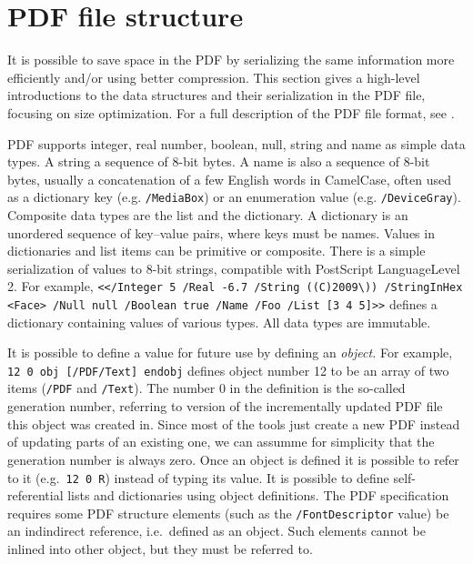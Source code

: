\documentclass{ltugproc}
\begin{document}
\section{PDF file structure}

It is possible to save space in the PDF by serializing the same information
more efficiently and/or using better compression. This section gives a
high-level introductions to the data structures and their serialization in
the PDF file, focusing on size optimization. For a full description of the
PDF file format, see \cite{pdfref}.

PDF supports integer, real number, boolean, null, string and name as
simple data types. A string a sequence of 8-bit bytes. A name is also a
sequence of 8-bit bytes, usually a concatenation of a few English words in
CamelCase, often used as a dictionary key (e.g. \texttt{/MediaBox}) or an
enumeration value (e.g. \texttt{/DeviceGray}). Composite data types are the
list and the dictionary. A dictionary is an unordered sequence of key--value
pairs, where keys must be names. Values in dictionaries and list items can
be primitive or composite. There is a simple serialization of values to
8-bit strings, compatible with PostScript LanguageLevel\,2. For example,
\texttt{\hbox{<}</Integer 5 /Real -6.7 /String ((C)2009\textbackslash))
/StringInHex <Face> /Null null
/Boolean true /Name /Foo /List [3 4 5]\hbox{>}>} defines a dictionary
containing values of various types. All data types are immutable.

It is possible to define a value for future use by defining an
\emph{object.} For example, \texttt{12 0 obj [/PDF/Text] endobj} defines
object number 12 to be an array of two items (\texttt{/PDF} and
\texttt{/Text}). The number 0 in the definition is the so-called generation
number, referring to version of the incrementally updated PDF file this
object was created in. Since most of the tools just create a new PDF instead
of updating parts of an existing one, we can assumme for simplicity that the
generation number is always zero. Once an object is defined it is possible
to refer to it (e.g.\ \texttt{12 0 R}) instead of typing its value. It is
possible to define self-referential lists and dictionaries using object
definitions. The PDF specification requires some PDF structure elements
(such as the \texttt{/FontDescriptor} value) be an indindirect reference,
i.e.\ defined as an object. Such elements cannot be inlined into other
object, but they must be referred to.
\end{document}
